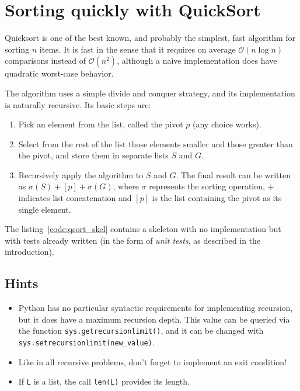 
\section{Sorting quickly with QuickSort }

Quicksort is one of the best known, and probably the simplest, fast
algorithm for sorting $n$ items. It is fast in the sense that it
requires on average $\mathcal{O}(n\log n)$ comparisons instead of
$\mathcal{O}(n^{2})$, although a naive implementation does have quadratic
worst-case behavior.

The algorithm uses a simple divide and conquer strategy, and its implementation
is naturally recursive. Its basic steps are:

\begin{enumerate}
\item Pick an element from the list, called the pivot $p$ (any choice works).
\item Select from the rest of the list those elements smaller and those
greater than the pivot, and store them in separate lists $S$ and
$G$.
\item Recursively apply the algorithm \texttt{}to $S$ and $G$. The final
result can be written as $\sigma(S)+[p]+\sigma(G)$, where $\sigma$
represents the sorting operation, $+$ indicates list concatenation
and $[p]$ is the list containing the pivot as its single element.
\end{enumerate}
The listing~\ref{code:qsort_skel} contains a skeleton with no implementation
but with tests already written (in the form of \emph{unit tests},
as described in the introduction).




\subsection*{Hints}

\begin{itemize}
\item Python has no particular syntactic requirements for implementing recursion,
but it does have a maximum recursion depth. This value can be queried
via the function \texttt{sys.getrecursionlimit()}, and it can be changed
with \texttt{sys.setrecursionlimit(new\_value)}. 
\item Like in all recursive problems, don't forget to implement an exit
condition!
\item If \texttt{L} is a list, the call \texttt{len(L)} provides its length.
\end{itemize}

